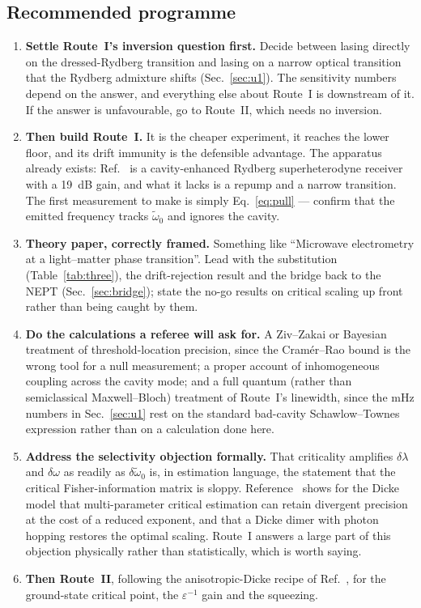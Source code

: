 \documentclass[11pt,a4paper]{article}
\newcommand{\wt}{\tilde{\omega}_{0}}
\begin{document}
\subsection{Recommended programme}

\begin{enumerate}
  \item \textbf{Settle Route~I's inversion question first.} Decide between lasing directly on
        the dressed-Rydberg transition and lasing on a narrow optical transition that the
        Rydberg admixture shifts (Sec.~\ref{sec:u1}). The sensitivity numbers depend on the
        answer, and everything else about Route~I is downstream of it. If the answer is
        unfavourable, go to Route~II, which needs no inversion.
  \item \textbf{Then build Route~I.} It is the cheaper experiment, it reaches the lower floor,
        and its drift immunity is the defensible advantage. The apparatus already exists:
        Ref.~\cite{CavitySuperhet2025} is a cavity-enhanced Rydberg superheterodyne receiver
        with a 19~dB gain, and what it lacks is a repump and a narrow transition. The first
        measurement to make is simply Eq.~\eqref{eq:pull} --- confirm that the emitted
        frequency tracks $\wt$ and ignores the cavity.
  \item \textbf{Theory paper, correctly framed.} Something like ``Microwave electrometry at a
        light--matter phase transition''. Lead with the substitution (Table~\ref{tab:three}),
        the drift-rejection result and the bridge back to the NEPT
        (Sec.~\ref{sec:bridge}); state the no-go results on critical scaling up front rather
        than being caught by them.
  \item \textbf{Do the calculations a referee will ask for.} A Ziv--Zakai or Bayesian treatment
        of threshold-location precision, since the Cram\'er--Rao bound is the wrong tool for a
        null measurement; a proper account of inhomogeneous coupling across the cavity mode;
        and a full quantum (rather than semiclassical Maxwell--Bloch) treatment of Route~I's
        linewidth, since the mHz numbers in Sec.~\ref{sec:u1} rest on the standard
        bad-cavity Schawlow--Townes expression rather than on a calculation done here.
  \item \textbf{Address the selectivity objection formally.} That criticality amplifies
        $\delta\lambda$ and $\delta\omega$ as readily as $\delta\wt$ is, in estimation
        language, the statement that the critical Fisher-information matrix is sloppy.
        Reference~\cite{MultiCrit2026} shows for the Dicke model that multi-parameter critical
        estimation can retain divergent precision at the cost of a reduced exponent, and that a
        Dicke dimer with photon hopping restores the optimal scaling. Route~I answers a large
        part of this objection physically rather than statistically, which is worth saying.
  \item \textbf{Then Route~II}, following the anisotropic-Dicke recipe of
        Ref.~\cite{Anisotropic2025}, for the ground-state critical point, the
        $\varepsilon^{-1}$ gain and the squeezing.
\end{enumerate}
\end{document}
